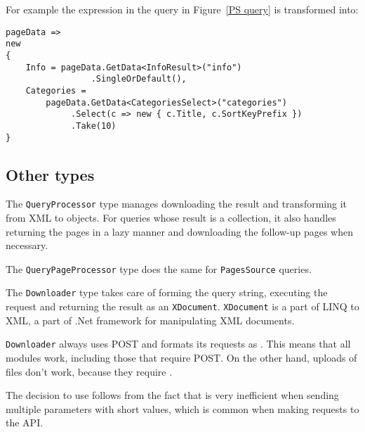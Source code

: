 
For example the expression in the query in Figure~\ref{PS query} is transformed into:

\begin{lstlisting}
pageData =>
new
{
    Info = pageData.GetData<InfoResult>("info")
    		     .SingleOrDefault(),
    Categories =
    	pageData.GetData<CategoriesSelect>("categories")
    		 .Select(c => new { c.Title, c.SortKeyPrefix })
    		 .Take(10)
}
\end{lstlisting}

\subsection{Other types}

The \lstinline{QueryProcessor} type manages downloading the result and transforming it from XML to objects.
For queries whose result is a collection, it also handles returning the pages in a lazy manner
and downloading the follow-up pages when necessary.

The \lstinline{QueryPageProcessor} type does the same for \lstinline{PagesSource} queries.

\medskip

The \lstinline{Downloader} type takes care of forming the query string, executing the request and
returning the result as an \lstinline{XDocument}.
\lstinline{XDocument} is a part of LINQ to XML, a part of .Net framework for manipulating XML documents.

\lstinline{Downloader} always uses POST and formats its requests as .
This means that all modules work, including those that require POST.
On the other hand, uploads of files don't work, because they require .

The decision to use  follows from the fact that
 is very inefficient when sending multiple parameters with short values,
which is common when making requests to the API.

